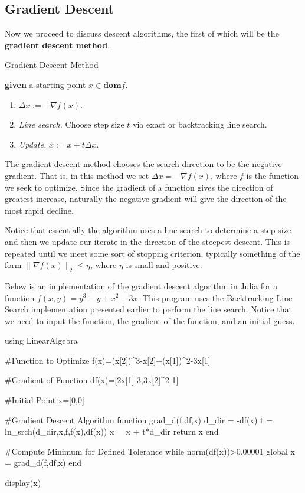 \documentclass[11pt]{article}
\begin{document}
\subsection*{Gradient Descent}
Now we proceed to discuss descent algorithms, the first of which will be the {\color{tiananmen}\textbf{gradient descent method}}.
\begin{algorithm}[H]
	\caption{Gradient Descent Method \cite{Boyd2004}\label{GradientDescentAlg}}
	\begin{algorithmic} 
		\State \textbf{given} a starting point $x\in\textbf{dom}f$.
		\Repeat
		\begin{enumerate}
			\item $\Delta x:=-\nabla f(x)$.
			\item \textit{Line search.} Choose step size $t$ via exact or backtracking line search.
			\item \textit{Update.} $x:=x+t\Delta x$.
		\end{enumerate}
	\end{algorithmic}
\end{algorithm}
The gradient descent method chooses the search direction to be the negative gradient. That is, in this method we set $\Delta x=-\nabla f(x)$, where $f$ is the function we seek to optimize. Since the gradient of a function gives the direction of greatest increase, naturally the negative gradient will give the direction of the most rapid decline.

Notice that essentially the algorithm uses a line search to determine a step size and then we update our iterate in the direction of the steepest descent. This is repeated until we meet some sort of stopping criterion, typically something of the form $\|\nabla f(x)\|_2\leq\eta$, where $\eta$ is small and positive.

Below is an implementation of the gradient descent algorithm in Julia for a function $f(x,y)=y^3-y+x^2-3x$. This program uses the Backtracking Line Search implementation presented earlier to perform the line search. Notice that we need to input the function, the gradient of the function, and an initial guess.
\begin{jllisting}
	using LinearAlgebra
	
	#Function to Optimize
	f(x)=(x[2])^3-x[2]+(x[1])^2-3x[1]
	
	#Gradient of Function
	df(x)=[2x[1]-3,3x[2]^2-1]
	
	#Initial Point
	x=[0,0]
	
	#Gradient Descent Algorithm
	function grad_d(f,df,x)
		d_dir = -df(x)
		t = ln_srch(d_dir,x,f,f(x),df(x))
		x = x + t*d_dir
		return x
	end
	
	#Compute Minimum for Defined Tolerance
	while norm(df(x))>0.00001
		global x = grad_d(f,df,x)
	end
	
	display(x)
	
\end{jllisting}
\end{document}
